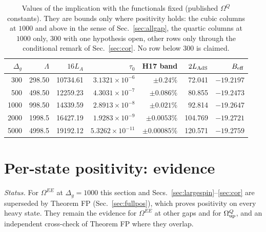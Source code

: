 \documentclass[aps,prl,onecolumn,superscriptaddress,nofootinbib]{revtex4-2}
\begin{document}
\begin{table}[!htbp]
\caption{\label{tab:dg}Values of the implication with the functionals fixed (published $\Omega^Q$
constants). They are bounds only where positivity holds: the cubic columns at $1000$ and above in the sense of
Sec.~\ref{sec:allgap}, the quartic columns at $1000$ only, $300$ with one hypothesis open, other rows only through the
conditional remark of Sec.~\ref{sec:cor}. No row below $300$ is claimed.}
\footnotesize
\begin{ruledtabular}
\begin{tabular}{rrrrrrr}
$\Delta_g$ & $\Lambda$ & $16L_A$ & $\tau_0$ & H17 band & $2L_{\rm AdS}$ & $B_{\rm eff}$\\\hline
300 & 298.50 & 10734.61 & $3.1321\times10^{-6}$ & $\pm0.24\%$ & 72.041 & $-19.2197$\\
500 & 498.50 & 12259.23 & $4.3031\times10^{-7}$ & $\pm0.086\%$ & 80.855 & $-19.2473$\\
1000 & 998.50 & 14339.59 & $2.8913\times10^{-8}$ & $\pm0.021\%$ & 92.814 & $-19.2647$\\
2000 & 1998.5 & 16427.19 & $1.9283\times10^{-9}$ & $\pm0.0053\%$ & 104.769 & $-19.2721$\\
5000 & 4998.5 & 19192.12 & $5.3262\times10^{-11}$ & $\pm0.00085\%$ & 120.571 & $-19.2759$\\
\end{tabular}
\end{ruledtabular}
\end{table}

\section{Per-state positivity: evidence}
\label{sec:pos}

\emph{Status.} For $\Omega^{EE}$ at $\Delta_g=1000$ this section and Secs.~\ref{sec:largespin}--\ref{sec:cor} are superseded by Theorem FP
(Sec.~\ref{sec:fullpos}), which proves positivity on every heavy state. They remain the evidence for $\Omega^{EE}$ at other gaps and for
$\Omega^Q_{\rm up}$, and an independent cross-check of Theorem FP where they overlap.
\end{document}
